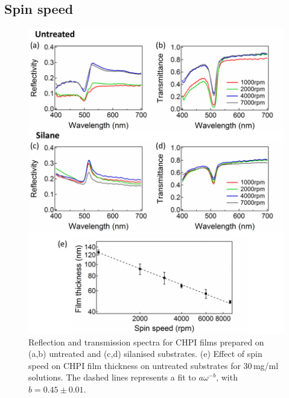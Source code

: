 \subsection{Spin speed}
\begin{figure}[h!] 
\centering    
\includegraphics[width=\textwidth]{Fig6}
\caption{Reflection and transmission spectra for CHPI films prepared on (a,b) untreated and (c,d) silanised substrates. (e) Effect of spin speed on CHPI film thickness on untreated substrates for 30\,mg/ml solutions. The dashed lines represents a fit to $a\omega^{-b}$, with $b=0.45\pm0.01$.}
\label{4Fig6}
\end{figure}
